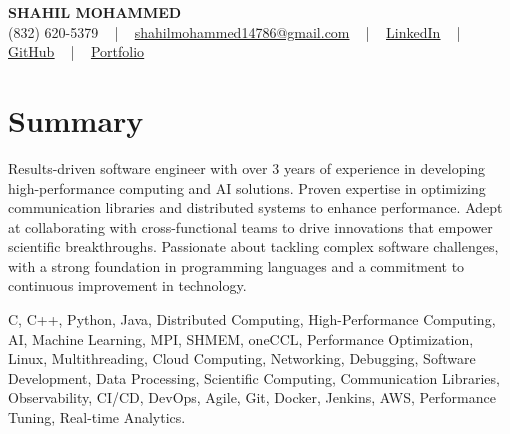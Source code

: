 \documentclass[letterpaper,10pt]{article}
\begin{document}
\begin{center}
    {\fontsize{14pt}{12pt}\selectfont \textbf{\MakeUppercase{Shahil Mohammed}}}\\ \vspace{2pt}
    \fontsize{10pt}{12pt}\selectfont (832) 620-5379 ~ | ~ \href{mailto:shahilmohammed14786@gmail.com}{shahilmohammed14786@gmail.com} ~ | ~  
    \href{https://www.linkedin.com/in/shahil-mohammed-9652931a1/}{\color{blue}\underline{LinkedIn}}  ~ | ~ 
    \href{https://github.com/freakbeast14}{\color{blue}\underline{GitHub}} ~ | ~ 
    \href{https://shahil-mohammed.netlify.app/}{\color{blue}\underline{Portfolio}}
    \vspace{-8pt}
\end{center}

\section{Summary}
\vspace{-2pt}\fontsize{8pt}{9pt}\selectfont
Results-driven software engineer with over 3 years of experience in developing high-performance computing and AI solutions. Proven expertise in optimizing communication libraries and distributed systems to enhance performance. Adept at collaborating with cross-functional teams to drive innovations that empower scientific breakthroughs. Passionate about tackling complex software challenges, with a strong foundation in programming languages and a commitment to continuous improvement in technology.

{\fontsize{1pt}{1pt}\selectfont\color{white}
C, C++, Python, Java, Distributed Computing, High-Performance Computing, AI, Machine Learning, MPI, SHMEM, oneCCL, Performance Optimization, Linux, Multithreading, Cloud Computing, Networking, Debugging, Software Development, Data Processing, Scientific Computing, Communication Libraries, Observability, CI/CD, DevOps, Agile, Git, Docker, Jenkins, AWS, Performance Tuning, Real-time Analytics.
}
\vspace{-8pt}

\vspace{-2pt}
\end{document}
